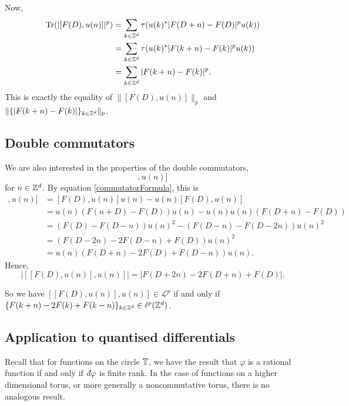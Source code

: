 Now,
\begin{align}
    \operatorname{Tr}(|[F(D),u(n)]|^p) &= \sum_{k \in \mathbb{Z}^d} \tau(u(k)^*|F(D+n)-F(D)|^pu(k))\\
    &= \sum_{k \in \mathbb{Z}^d} \tau(u(k)^*|F(k+n)-F(k)|^pu(k))\\
    &= \sum_{k \in \mathbb{Z}^d} |F(k+n)-F(k)|^p.
\end{align}
This is exactly the equality of $\|[F(D),u(n)]\|_p$ and $\|\{|F(k+n)-F(k)|\}_{k \in \mathbb{Z}^d}\|_p$.

\subsection{Double commutators}

We are also interested in the properties of the double commutators,
\begin{equation*}
    [[F(D),u(n)],u(n)]
\end{equation*}
for $n \in \mathbb{Z}^d$. By equation \ref{commutatorFormula}, this is
\begin{align}
    [[F(D),u(n)],u(n)] &= [F(D),u(n)]u(n) - u(n)[F(D),u(n)] \\
                       &= u(n)(F(n+D)-F(D))u(n)-u(n)u(n)(F(D+n)-F(D))\\
                       &= (F(D)-F(D-n))u(n)^2-(F(D-n)-F(D-2n))u(n)^2\\
                       &= (F(D-2n)-2F(D-n)+F(D))u(n)^2\\
                       &= u(n)(F(D+n)-2F(D)+F(D-n))u(n).
\end{align}
Hence,
\begin{equation*}
    |[[F(D),u(n)],u(n)]| = |F(D+2n)-2F(D+n)+F(D)|.
\end{equation*}

So we have $[[F(D),u(n)],u(n)] \in \mathcal{L}^p$
if and only if $\{F(k+n)-2F(k)+F(k-n)\}_{k\in \mathbb{Z}^d} \in \ell^p(\mathbb{Z}^d)$.

\subsection{Application to quantised differentials}
Recall that for functions on the circle $\mathbb{T}$, we have the result
that $\varphi$ is a rational function if and only if $\qd \varphi$
is finite rank. In the case of functions on a higher dimensional
torus, or more generally a noncommutative torus, there is no analogous
result.

